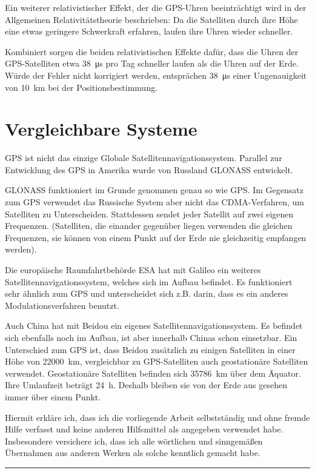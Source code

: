 \documentclass[12pt,a4paper]{scrartcl}
\begin{document}
Ein weiterer relativistischer Effekt, der die GPS-Uhren beeinträchtigt wird in der Allgemeinen Relativitätstheorie beschrieben: Da die Satelliten durch ihre Höhe eine etwas geringere Schwerkraft erfahren, laufen ihre Uhren wieder schneller.

Kombiniert sorgen die beiden relativistischen Effekte dafür, dass die Uhren der GPS-Satelliten etwa \SI{38}{\micro\second} pro Tag schneller laufen als die Uhren auf der Erde. Würde der Fehler nicht korrigiert werden, entsprächen \SI{38}{\micro\second} einer Ungenauigkeit von \SI{10}{\kilo\meter} bei der Positionsbestimmung. \cite{ohio_gpsrelativity}

\section{Vergleichbare Systeme}
GPS ist nicht das einzige Globale Satellitennavigationssystem. Parallel zur Entwicklung des GPS in Amerika wurde von Russland GLONASS entwickelt.

GLONASS funktioniert im Grunde genommen genau so wie GPS. Im Gegensatz zum GPS verwendet das Russische System aber nicht das CDMA-Verfahren, um Satelliten zu Unterscheiden. Stattdessen sendet jeder Satellit auf zwei eigenen Frequenzen. (Satelliten, die einander gegenüber liegen verwenden die gleichen Frequenzen, sie können von einem Punkt auf der Erde nie gleichzeitig empfangen werden).

Die europäische Raumfahrtbehörde ESA hat mit Galileo ein weiteres Satellitennavigationssystem, welches sich im Aufbau befindet. Es funktioniert sehr ähnlich zum GPS und unterscheidet sich z.B. darin, dass es ein anderes Modulationsverfahren benutzt.

Auch China hat mit Beidou ein eigenes Satellitennavigationssystem. Es befindet sich ebenfalls noch im Aufbau, ist aber innerhalb Chinas schon einsetzbar. Ein Unterschied zum GPS ist, dass Beidou zusätzlich zu einigen Satelliten in einer Höhe von \SI{22000}{\kilo\meter}, vergleichbar zu GPS-Satelliten auch geostationäre Satelliten verwendet. Geostationäre Satelliten befinden sich \SI{35786}{\kilo\meter} über dem Äquator. Ihre Umlaufzeit beträgt \SI{24}{\hour}. Deshalb bleiben sie von der Erde aus gesehen immer über einem Punkt. 
\newpage
\printbibliography

\vspace{2cm}
Hiermit erkläre ich, dass ich die vorliegende Arbeit selbstständig und ohne fremde Hilfe verfasst und keine anderen Hilfsmittel als angegeben verwendet habe. Insbesondere versichere ich, dass ich alle wörtlichen und sinngemäßen Übernahmen aus anderen Werken als solche kenntlich gemacht habe.
\vspace{2cm}
\hrule
\end{document}
